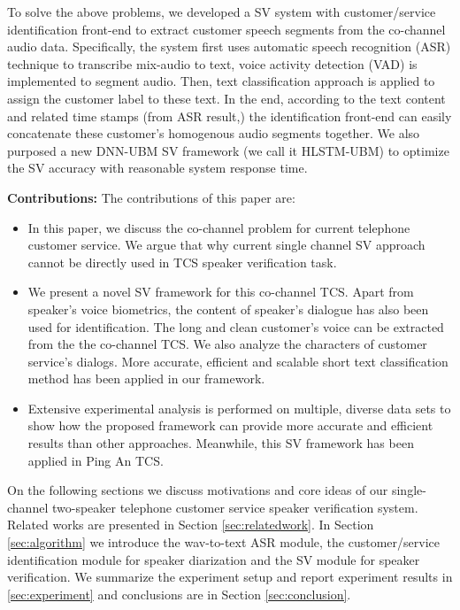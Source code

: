 To solve the above problems, we developed a SV system with customer/service identification front-end to extract customer speech segments from the co-channel audio data. Specifically, the system first uses automatic speech recognition (ASR) technique to transcribe mix-audio to text, voice activity detection (VAD) is implemented to segment audio. Then, text classification approach is applied to assign the customer label to these text. In the end, according to the text content and related time stamps (from ASR result,) the identification front-end can easily concatenate these customer's homogenous audio segments together. We also purposed a new DNN-UBM SV framework (we call it HLSTM-UBM) to optimize the SV accuracy with reasonable system response time.


\noindent \textbf{Contributions:} The contributions of this paper are:
\begin{itemize}

\item In this paper, we discuss the co-channel problem for current telephone customer service. We argue that why current single channel SV approach cannot be directly used in TCS speaker verification task.

\item We present a novel SV framework for this co-channel TCS. Apart from speaker's voice biometrics, the content of speaker's dialogue has also been used for identification. The long and clean customer's voice can be extracted from the the co-channel TCS. We also analyze the characters of customer service's dialogs. More accurate, efficient and scalable short text classification method has been applied in our framework.

\item Extensive experimental analysis is performed on multiple, diverse data sets to show how the proposed framework can provide more accurate and efficient results than other approaches. Meanwhile, this SV framework has been applied in Ping An TCS.

\end{itemize}

\noindent On the following sections we discuss motivations and core ideas of our single-channel two-speaker telephone customer service speaker verification system. Related works are presented in Section \ref{sec:relatedwork}. In Section \ref{sec:algorithm} we introduce the wav-to-text ASR module, the customer/service identification module for speaker diarization and the SV module for speaker verification. We summarize the experiment setup and report experiment results in \ref{sec:experiment} and conclusions are in Section \ref{sec:conclusion}.

